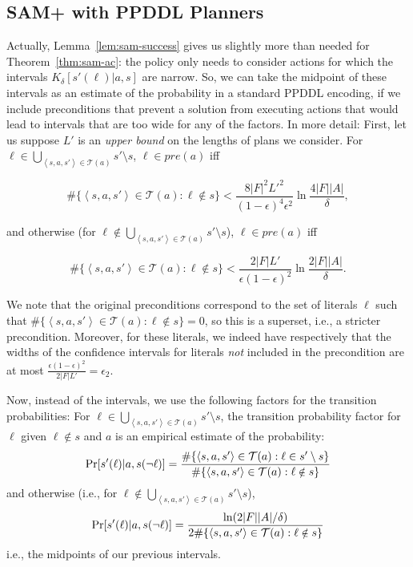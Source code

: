\documentclass[letterpaper]{article} %
\newcommand{\pre}{\textit{pre}}
\newcommand{\tuple}[1]{\ensuremath{\left \langle #1 \right \rangle }}
\begin{document}
\subsection{SAM+ with PPDDL Planners}
Actually, Lemma~\ref{lem:sam-success} gives us slightly more than needed for Theorem~\ref{thm:sam-ac}: the policy only needs to consider actions for which the intervals $K_\delta[s'(\ell)|a,s]$ are narrow. So, we can take the midpoint of these intervals as an estimate of the probability in a standard PPDDL encoding, if we include 
preconditions
that prevent a solution from executing actions that would lead to intervals that are too wide for any of the factors. In more detail: First, let us suppose $L'$ is an {\em upper bound} on the lengths of plans we consider. For $\ell\in\bigcup_{\tuple{s, a, s'}\in \mathcal{T}(a)} s'\setminus s $, $\ell\in\pre(a)$ iff 
\begin{small}
\begin{equation*}
\#\{\tuple{s, a, s'}\in \mathcal{T}(a):\ell\notin s\}< \frac{8|F|^2L'^2}{(1-\epsilon)^4\epsilon^2}\ln\frac{4|F||A|}{\delta},
\end{equation*}
\end{small}
and otherwise (for $\ell\notin\bigcup_{\tuple{s, a, s'}\in \mathcal{T}(a)} s'\setminus s $),  $\ell\in\pre(a)$ iff 
\begin{small}
\begin{equation*}
\#\{\tuple{s, a, s'}\in \mathcal{T}(a):\ell\notin s\}<\frac{2|F|L'}{\epsilon(1-\epsilon)^2}\ln\frac{2|F||A|}{\delta}.
\end{equation*}
\end{small}
We note that the original preconditions correspond to the set of literals $\ell$ such that $\#\{\tuple{s, a, s'}\in \mathcal{T}(a):\ell\notin s\}=0$, so this is a superset, i.e., a stricter precondition. Moreover, for these literals, we indeed have respectively that the widths of the confidence intervals for literals {\em not} included in the precondition are at most $\frac{\epsilon(1-\epsilon)^2}{2|F|L'}=\epsilon_2$.

Now, instead of the intervals, we use the following factors for the transition probabilities: For $\ell\in\bigcup_{\tuple{s, a, s'}\in \mathcal{T}(a)} s'\setminus s $, the transition probability factor for $\ell$ given $\ell\notin s$ and $a$ is an empirical estimate of the probability:
\begin{equation}
\small
\Pr[s'(\ell)|a,s(\neg\ell)]=\frac{\#\{\tuple{s, a, s'}\in \mathcal{T}(a):\ell\in s'\setminus s\}}{\#\{\tuple{s, a, s'}\in \mathcal{T}(a):\ell \notin s\}}
\end{equation}
and otherwise (i.e., for $\ell\notin\bigcup_{\tuple{s, a, s'}\in \mathcal{T}(a)} s'\setminus s $),
\begin{equation}
\small
\Pr[s'(\ell)|a,s(\neg\ell)]=\frac{\ln(2|F||A|/\delta)}{2\#\{\tuple{s, a, s'}\in \mathcal{T}(a):\ell\notin s\}}
\end{equation}
i.e., the midpoints of our previous intervals.
\end{document}
